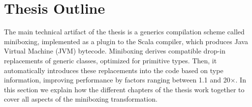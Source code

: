 
%
%
%

\section{Thesis Outline}

The main technical artifact of the thesis is a generics compilation scheme called miniboxing, implemented as a plugin to the Scala compiler, which produces Java Virtual Machine (JVM) bytecode. Miniboxing derives compatible drop-in replacements of generic classes, optimized for primitive types. Then, it automatically introduces these replacements into the code based on type information, improving performance by factors ranging between 1.1 and 20$\times$. In this section we explain how the different chapters of the thesis work together to cover all aspects of the miniboxing transformation.

